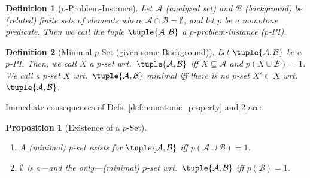 \documentclass[]{elsarticle}
\newcommand{\ma}{\mathcal{A}}
\newcommand{\mb}{\mathcal{B}}
\newtheorem{definition}{Definition}[]{}
\newtheorem{proposition}{Proposition}[]{}
\begin{document}
	\begin{definition}[$p$-Problem-Instance]\label{def:p-PI}
		Let $\ma$ (analyzed set) and $\mb$ (background) be (related) finite sets of elements where $\ma \cap \mb = \emptyset$, and let $p$ be a monotone predicate. Then we call the tuple $\tuple{\ma,\mb}$ a $p$-problem-instance ($p$-PI).
	\end{definition}
	\begin{definition}[Minimal $p$-Set (given some Background)]\label{def:min_p-set}
		Let $\tuple{\ma,\mb}$ be a $p$-PI. Then, we call $X$ a \emph{$p$-set wrt.\ $\tuple{\ma,\mb}$} iff $X\subseteq \ma$ and $p(X \cup \mb)=1$. We call a $p$-set $X$ wrt.\ $\tuple{\ma,\mb}$ \emph{minimal} iff there is no $p$-set $X' \subset X$ wrt.\ $\tuple{\ma,\mb}$. 
		
	\end{definition}
	Immediate consequences of Defs. \ref{def:monotonic_property} and \ref{def:min_p-set} are:
	\begin{proposition}[Existence of a $p$-Set]\label{prop:existence_of_p-set}
		\leavevmode
		\begin{enumerate}[noitemsep,label=(\arabic*)]
			\item \label{prop:existence_of_p-set:1} A (minimal) $p$-set exists for $\tuple{\ma,\mb}$ iff $p(\ma\cup\mb)=1$.
			\item \label{prop:existence_of_p-set:2} $\emptyset$ is a---and the only---(minimal) $p$-set wrt.\ $\tuple{\ma,\mb}$ iff $p(\mb)=1$.
		\end{enumerate}
	\end{proposition}
	
\end{document}
